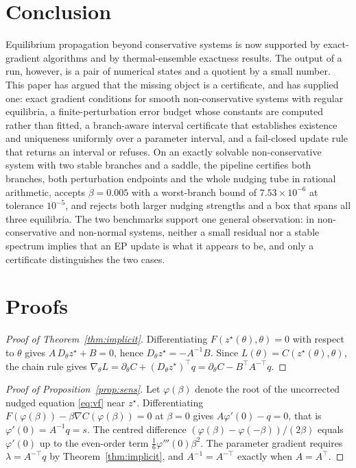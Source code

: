 \documentclass[11pt]{article}
\theoremstyle{definition}
\theoremstyle{remark}
\newcommand{\grad}{\nabla}
\begin{document}
\section{Conclusion}

Equilibrium propagation beyond conservative systems is now supported by exact-gradient algorithms
and by thermal-ensemble exactness results. The output of a run, however, is a pair of numerical
states and a quotient by a small number. This paper has argued that the missing
object is a certificate, and has supplied one: exact gradient conditions for smooth
non-conservative systems with regular equilibria, a finite-perturbation error budget whose
constants are computed rather than fitted, a branch-aware interval certificate that establishes
existence and uniqueness uniformly over a parameter interval, and a fail-closed update rule that
returns an interval or refuses. On an exactly solvable non-conservative system with two stable
branches and a saddle, the pipeline certifies both branches, both perturbation endpoints and the
whole nudging tube in rational arithmetic, accepts $\beta = 0.005$ with a worst-branch bound of
$7.53\times10^{-6}$ at tolerance $10^{-5}$, and rejects both larger nudging strengths and a box
that spans all three equilibria. The two benchmarks support one general observation: in
non-conservative and non-normal systems, neither a small residual nor a stable spectrum implies
that an EP update is what it appears to be, and only a certificate distinguishes the two cases.

\appendix

\section{Proofs}\label{app:proofs}

\begin{proof}[Proof of Theorem~\ref{thm:implicit}]
Differentiating $F(z^\star(\theta),\theta) = 0$ with respect to $\theta$ gives
$A\,D_\theta z^\star + B = 0$, hence $D_\theta z^\star = -A^{-1}B$. Since
$L(\theta) = C(z^\star(\theta),\theta)$, the chain rule gives
$\grad_\theta L = \partial_\theta C + (D_\theta z^\star)^{\top} q
= \partial_\theta C - B^{\top}A^{-\top}q$.
\end{proof}

\begin{proof}[Proof of Proposition~\ref{prop:sens}]
Let $\varphi(\beta)$ denote the root of the uncorrected nudged equation
\eqref{eq:vf} near $z^\star$. Differentiating
$F(\varphi(\beta)) - \beta\grad C(\varphi(\beta)) = 0$ at $\beta = 0$ gives
$A\varphi'(0) - q = 0$, that is $\varphi'(0) = A^{-1}q = s$. The centred difference
$(\varphi(\beta)-\varphi(-\beta))/(2\beta)$ equals $\varphi'(0)$ up to the even-order term
$\tfrac16\varphi'''(0)\beta^2$. The parameter gradient requires
$\lambda = A^{-\top}q$ by Theorem~\ref{thm:implicit}, and $A^{-1} = A^{-\top}$ exactly when
$A = A^{\top}$.
\end{proof}
\end{document}
